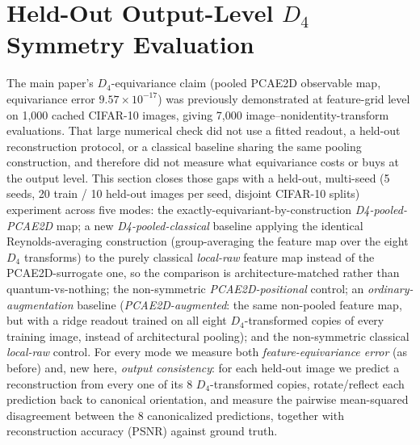 \documentclass[11pt]{article}
\begin{document}
\section{Held-Out Output-Level \texorpdfstring{$D_4$}{D4} Symmetry Evaluation}
\label{sec:d4_symmetry_experiment}
The main paper's $D_4$-equivariance claim (pooled PCAE2D observable map, equivariance error $9.57\times10^{-17}$) was previously demonstrated at feature-grid level on 1,000 cached CIFAR-10 images, giving 7,000 image--nonidentity-transform evaluations. That large numerical check did not use a fitted readout, a held-out reconstruction protocol, or a classical baseline sharing the same pooling construction, and therefore did not measure what equivariance costs or buys at the output level. This section closes those gaps with a held-out, multi-seed (5 seeds, 20 train / 10 held-out images per seed, disjoint CIFAR-10 splits) experiment across five modes: the exactly-equivariant-by-construction \emph{D4-pooled-PCAE2D} map; a new \emph{D4-pooled-classical} baseline applying the identical Reynolds-averaging construction (group-averaging the feature map over the eight $D_4$ transforms) to the purely classical \emph{local-raw} feature map instead of the PCAE2D-surrogate one, so the comparison is architecture-matched rather than quantum-vs-nothing; the non-symmetric \emph{PCAE2D-positional} control; an \emph{ordinary-augmentation} baseline (\emph{PCAE2D-augmented}: the same non-pooled feature map, but with a ridge readout trained on all eight $D_4$-transformed copies of every training image, instead of architectural pooling); and the non-symmetric classical \emph{local-raw} control. For every mode we measure both \emph{feature-equivariance error} (as before) and, new here, \emph{output consistency}: for each held-out image we predict a reconstruction from every one of its 8 $D_4$-transformed copies, rotate/reflect each prediction back to canonical orientation, and measure the pairwise mean-squared disagreement between the 8 canonicalized predictions, together with reconstruction accuracy (PSNR) against ground truth.
\end{document}

